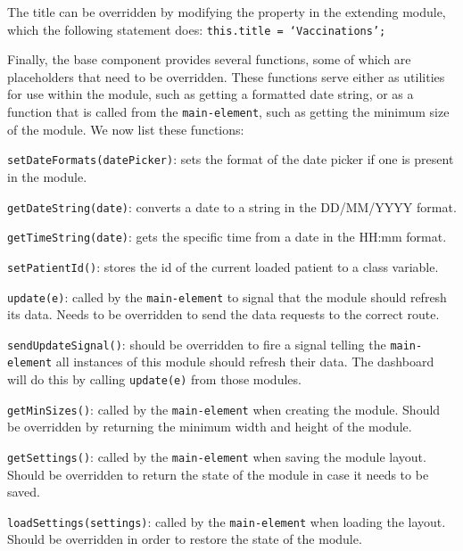             \noindent The title can be overridden by modifying the property in the extending module, which the following statement does: \texttt{this.title = `Vaccinations';}\medskip

            \noindent Finally, the base component provides several functions, some of which are placeholders that need to be overridden. These functions serve either as utilities for use within the module, such as getting a formatted date string, or as a function that is called from the \texttt{main-element}, such as getting the minimum size of the module. We now list these functions:
            \vspace{-6pt}
            \begin{myitemize}
                \item \texttt{setDateFormats(datePicker)}: sets the format of the date picker if one is present in the module.
                \item \texttt{getDateString(date)}: converts a date to a string in the DD/MM/YYYY format.
                \item \texttt{getTimeString(date)}: gets the specific time from a date in the HH:mm format.
                \item \texttt{setPatientId()}: stores the id of the current loaded patient to a class variable.
                \item \texttt{update(e)}: called by the \texttt{main-element} to signal that the module should refresh its data. Needs to be overridden to send the data requests to the correct route.
                \item \texttt{sendUpdateSignal()}: should be overridden to fire a signal telling the \texttt{main-element} all instances of this module should refresh their data. The dashboard will do this by calling \texttt{update(e)} from those modules.
                \item \texttt{getMinSizes()}: called by the \texttt{main-element} when creating the module. Should be overridden by returning the minimum width and height of the module.
                \item \texttt{getSettings()}: called by the \texttt{main-element} when saving the module layout. Should be overridden to return the state of the module in case it needs to be saved.
                \item \texttt{loadSettings(settings)}: called by the \texttt{main-element} when loading the layout. Should be overridden in order to restore the state of the module.
            \end{myitemize}

